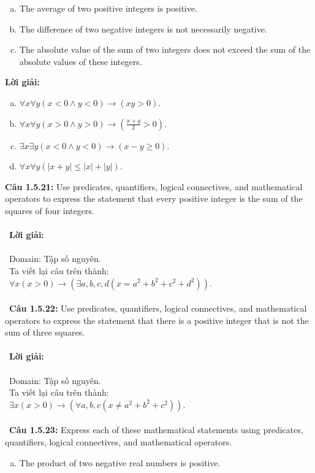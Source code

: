 \documentclass[a4paper]{article}
\begin{document}
\begin{enumerate}
\begin{enumerate}[a)]
\item The average of two positive integers is positive.
\item The difference of two negative integers is not necessarily negative.
\item The absolute value of the sum of two integers does not exceed the sum of the absolute values of these integers.
\end{enumerate}
\textbf{Lời giải: }
\begin{enumerate}[a)]
\item $\forall x \forall y (x < 0 \land y < 0) \rightarrow (xy > 0)$.
\item $\forall x \forall y (x > 0 \land y > 0) \rightarrow (\frac{x+y}{2} > 0)$.
\item $\exists x \exists y (x < 0 \land y < 0) \rightarrow (x-y \geq 0)$.
\item $\forall x \forall y (|x+y| \leq |x|+|y|)$.
\end{enumerate}
\textbf{Câu 1.5.21: }Use predicates, quantifiers, logical connectives, and mathematical operators to express the statement that every positive integer is the sum of the squares of four integers. \\\ \\\
\textbf{Lời giải: } \\\ \\\
Domain: Tập số nguyên. \\\
Ta viết lại câu trên thành: \\\
$\forall x (x > 0) \rightarrow (\exists a,b,c,d(x = a^2+b^2+c^2+d^2)).$ \\\ \\\
\textbf{Câu 1.5.22: }Use predicates, quantifiers, logical connectives, and mathematical operators to express the statement that there is a positive integer that is not the sum of three squares. \\\ \\\
\textbf{Lời giải:} \\\ \\\
Domain: Tập số nguyên. \\\
Ta viết lại câu trên thành: \\\
$\exists x (x > 0) \rightarrow (\forall a,b,c(x \neq a^2+b^2+c^2)).$\\\ \\\
\textbf{Câu 1.5.23: }Express each of these mathematical statements using predicates, quantifiers, logical connectives, and mathematical operators.
\begin{enumerate}[a)]
\item The product of two negative real numbers is positive.

\end{enumerate}
\end{enumerate}
\end{document}
